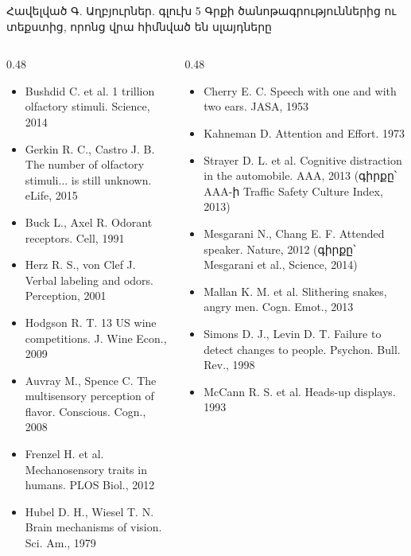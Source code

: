 \begin{frame}{Հավելված Գ. Աղբյուրներ. գլուխ 5}
  \scriptsize
  Գրքի ծանոթագրություններից ու տեքստից, որոնց վրա հիմնված են սլայդները\par\smallskip
  \begin{columns}[T]
    \begin{column}{0.48\textwidth}
      \begin{itemize}\setlength{\itemsep}{0.2mm}
        \item Bushdid C. et al. 1 trillion olfactory stimuli. Science, 2014
        \item Gerkin R. C., Castro J. B. The number of olfactory stimuli... is still unknown. eLife, 2015
        \item Buck L., Axel R. Odorant receptors. Cell, 1991
        \item Herz R. S., von Clef J. Verbal labeling and odors. Perception, 2001
        \item Hodgson R. T. 13 US wine competitions. J. Wine Econ., 2009
        \item Auvray M., Spence C. The multisensory perception of flavor. Conscious. Cogn., 2008
        \item Frenzel H. et al. Mechanosensory traits in humans. PLOS Biol., 2012
        \item Hubel D. H., Wiesel T. N. Brain mechanisms of vision. Sci. Am., 1979
      \end{itemize}
    \end{column}
    \begin{column}{0.48\textwidth}
      \begin{itemize}\setlength{\itemsep}{0.2mm}
        \item Cherry E. C. Speech with one and with two ears. JASA, 1953
        \item Kahneman D. Attention and Effort. 1973
        \item Strayer D. L. et al. Cognitive distraction in the automobile. AAA, 2013 (գիրքը՝ AAA-ի Traffic Safety Culture Index, 2013)
        \item Mesgarani N., Chang E. F. Attended speaker. Nature, 2012 (գիրքը՝ Mesgarani et al., Science, 2014)
        \item Mallan K. M. et al. Slithering snakes, angry men. Cogn. Emot., 2013
        \item Simons D. J., Levin D. T. Failure to detect changes to people. Psychon. Bull. Rev., 1998
        \item McCann R. S. et al. Heads-up displays. 1993
      \end{itemize}
    \end{column}
  \end{columns}
\end{frame}
